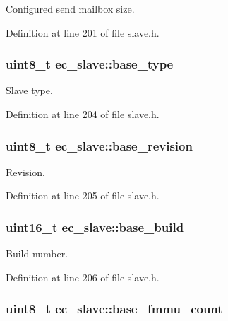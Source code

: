 \-Configured send mailbox size. 



\-Definition at line 201 of file slave.\-h.

\subsubsection[{base\-\_\-type}]{\setlength{\rightskip}{0pt plus 5cm}uint8\-\_\-t {\bf ec\-\_\-slave\-::base\-\_\-type}}\label{structec__slave_a942db00c8dc12ba78cd124b353945301}


\-Slave type. 



\-Definition at line 204 of file slave.\-h.

\subsubsection[{base\-\_\-revision}]{\setlength{\rightskip}{0pt plus 5cm}uint8\-\_\-t {\bf ec\-\_\-slave\-::base\-\_\-revision}}\label{structec__slave_a5346100cbd1fa0187ae3074d4a75d3cc}


\-Revision. 



\-Definition at line 205 of file slave.\-h.

\subsubsection[{base\-\_\-build}]{\setlength{\rightskip}{0pt plus 5cm}uint16\-\_\-t {\bf ec\-\_\-slave\-::base\-\_\-build}}\label{structec__slave_afd680b0cb700169c2a97aa38c0fd0552}


\-Build number. 



\-Definition at line 206 of file slave.\-h.

\subsubsection[{base\-\_\-fmmu\-\_\-count}]{\setlength{\rightskip}{0pt plus 5cm}uint8\-\_\-t {\bf ec\-\_\-slave\-::base\-\_\-fmmu\-\_\-count}}\label{structec__slave_a45adb760f44d08fcab9c81d6022e0bad}


